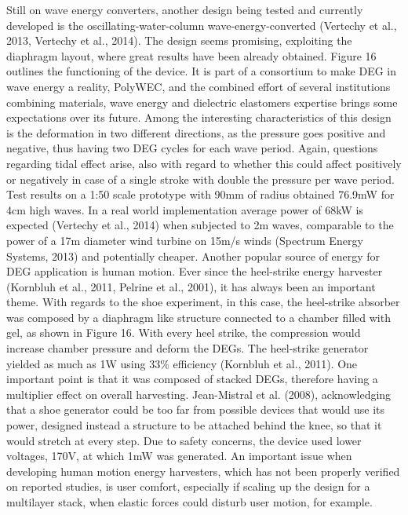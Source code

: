 Still on wave energy converters, another design being tested and currently developed is the oscillating-water-column wave-energy-converted (Vertechy et al., 2013, Vertechy et al., 2014). The design seems promising, exploiting the diaphragm layout, where great results have been already obtained. Figure 16 outlines the functioning of the device. It is part of a consortium to make DEG in wave energy a reality, PolyWEC, and the combined effort of several institutions combining materials, wave energy and dielectric elastomers expertise brings some expectations over its future. Among the interesting characteristics of this design is the deformation in two different directions, as the pressure goes positive and negative, thus having two DEG cycles for each wave period. Again, questions regarding tidal effect arise, also with regard to whether this could affect positively or negatively in case of a single stroke with double the pressure per wave period. Test results on a 1:50 scale prototype with 90mm of radius obtained 76.9mW for 4cm high waves. In a real world implementation average power of 68kW is expected (Vertechy et al., 2014) when subjected to 2m waves, comparable to the power of a 17m diameter wind turbine on 15m/s winds (Spectrum Energy Systems, 2013) and potentially cheaper.
Another popular source of energy for DEG application is human motion. Ever since the heel-strike energy harvester (Kornbluh et al., 2011, Pelrine et al., 2001), it has always been an important theme. With regards to the shoe experiment, in this case, the heel-strike absorber was composed by a diaphragm like structure connected to a chamber filled with gel, as shown in Figure 16. With every heel strike, the compression would increase chamber pressure and deform the DEGs. The heel-strike generator yielded as much as 1W using 33\% efficiency (Kornbluh et al., 2011). One important point is that it was composed of stacked DEGs, therefore having a multiplier effect on overall harvesting. Jean-Mistral et al. (2008), acknowledging that a shoe generator could be too far from possible devices that would use its power, designed instead a structure to be attached behind the knee, so that it would stretch at every step. Due to safety concerns, the device used lower voltages, 170V, at which 1mW was generated. An important issue when developing human motion energy harvesters, which has not been properly verified on reported studies, is user comfort, especially if scaling up the design for a multilayer stack, when elastic forces could disturb user motion, for example. 
